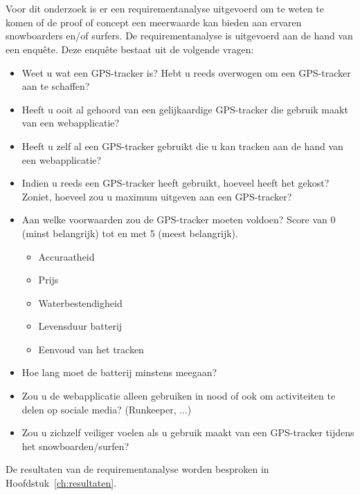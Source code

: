 \section{}
\label{ch:requirementAnalyse}
Voor dit onderzoek is er een requirementanalyse uitgevoerd om te weten te komen of de proof of concept een meerwaarde kan bieden aan ervaren snowboarders en/of surfers. De requirementanalyse is uitgevoerd aan de hand van een enquête. Deze enquête bestaat uit de volgende vragen:
\begin{itemize}
	\item Weet u wat een GPS-tracker is? Hebt u reeds overwogen om een GPS-tracker aan te schaffen?
	\item Heeft u ooit al gehoord van een gelijkaardige GPS-tracker die gebruik maakt van een webapplicatie?
	\item Heeft u zelf al een GPS-tracker gebruikt die u kan tracken aan de hand van een webapplicatie?
	\item Indien u reeds een GPS-tracker heeft gebruikt, hoeveel heeft het gekost? Zoniet, hoeveel zou u maximum uitgeven aan een GPS-tracker?
	\item Aan welke voorwaarden zou de GPS-tracker moeten voldoen? Score van 0 (minst belangrijk) tot en met 5 (meest belangrijk).
	\begin{itemize}
		\item Accuraatheid
		\item Prijs
		\item Waterbestendigheid
		\item Levensduur batterij
		\item Eenvoud van het tracken
	\end{itemize}
	\item Hoe lang moet de batterij minstens meegaan?
	\item Zou u de webapplicatie alleen gebruiken in nood of ook om activiteiten te delen op sociale media? (Runkeeper, ...)
	\item Zou u zichzelf veiliger voelen als u gebruik maakt van een GPS-tracker tijdens het snowboarden/surfen?
\end{itemize}
De resultaten van de requirementanalyse worden besproken in Hoofdstuk~\ref{ch:resultaten}.


